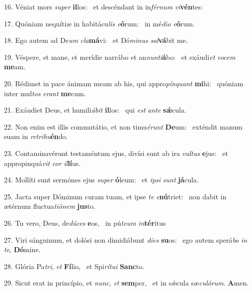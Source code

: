 16. Véniat mors \textit{su}\textit{per} \textbf{il}los: \ast\  et descéndant in in\textit{fér}\textit{num} \textit{vi}\textbf{vén}tes:\

17. Quóniam nequítiæ in habitácu\textit{lis} \textit{e}\textbf{ó}rum: \ast\  in mé\textit{di}\textit{o} \textit{e}\textbf{ó}rum.\

18. Ego autem ad De\textit{um} \textit{cla}\textbf{má}vi: \ast\  et Dó\textit{mi}\textit{nus} \textit{sal}\textbf{vá}bit me.\

19. Véspere, et mane, et merídie narrábo et an\textit{nun}\textit{ti}\textbf{á}bo: \ast\  et exáudi\textit{et} \textit{vo}\textit{cem} \textbf{me}am.\

20. Rédimet in pace ánimam meam ab his, qui appro\textit{pín}\textit{quant} \textbf{mi}hi: \ast\  quóniam inter mul\textit{tos} \textit{e}\textit{rant} \textbf{me}cum.\

21. Exáudiet Deus, et humili\textit{á}\textit{bit} \textbf{il}los: \ast\  qui \textit{est} \textit{an}\textit{te} \textbf{sǽ}cula.\

22. Non enim est illis commutátio, et non timu\textit{é}\textit{runt} \textbf{De}um: \ast\  exténdit manum suam in \textit{re}\textit{tri}\textit{bu}\textbf{én}do.\

23. Contaminavérunt testaméntum ejus, divísi sunt ab ira \textit{vul}\textit{tus} \textbf{e}jus: \ast\  et appropinquá\textit{vit} \textit{cor} \textit{il}\textbf{lí}us.\

24. Mollíti sunt sermónes ejus \textit{su}\textit{per} \textbf{ó}leum: \ast\  et \textit{ip}\textit{si} \textit{sunt} \textbf{já}cula.\

25. Jacta super Dóminum curam tuam, et ipse \textit{te} \textit{e}\textbf{nú}triet: \ast\  non dabit in ætérnum fluctua\textit{ti}\textit{ó}\textit{nem} \textbf{jus}to.\

26. Tu vero, Deus, de\textit{dú}\textit{ces} \textbf{e}os, \ast\  in pú\textit{te}\textit{um} \textit{in}\textbf{tér}itus\

27. Viri sánguinum, et dolósi non dimidiábunt \textit{di}\textit{es} \textbf{su}os: \ast\  ego autem sperá\textit{bo} \textit{in} \textit{te}, \textbf{Dó}mine.\

28. Glória Pa\textit{tri}, \textit{et} \textbf{Fí}lio, \ast\  et Spi\textit{rí}\textit{tu}\textit{i} \textbf{Sanc}to.\

29. Sicut erat in princípio, et \textit{nunc}, \textit{et} \textbf{sem}per, \ast\  et in sǽcula sæ\textit{cu}\textit{ló}\textit{rum}. \textbf{A}men.\


